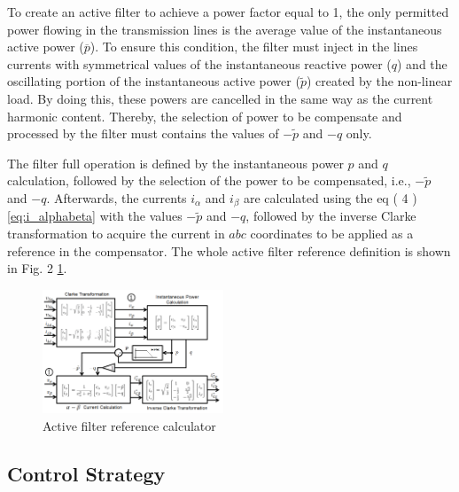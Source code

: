 To create an active filter to achieve a power factor equal to 1, the only permitted power flowing in the transmission lines is the average value of the instantaneous active power ($\overline{p}$). To ensure this condition, the filter must inject in the lines currents with symmetrical values of the instantaneous reactive power ($q$) and the oscillating portion of the instantaneous active power ($\tilde{p}$) created by the non-linear load. By doing this, these powers are cancelled in the same way as the current harmonic content. Thereby, the selection of power to be compensate and processed by the filter must contains the values of $-\tilde{p}$ and $-q$ only.

The filter full operation is defined by the instantaneous power $p$ and $q$ calculation, followed by the selection of the power to be compensated, i.e., $-\tilde{p}$ and $-q$. Afterwards, the currents $i_{\alpha}$ and $i_{\beta}$ are calculated using the eq ( 4 ) \ref{eq:i_alphabeta} with the values $-\tilde{p}$ and $-q$, followed by the inverse Clarke transformation to acquire the current in $abc$ coordinates to be applied as a reference in the compensator. The whole active filter reference definition is shown in Fig. 2 \ref{fig:diagrama_filtro.png}.

\begin{figure}[!th]
	\centering
	\includegraphics[width=0.48\textwidth]{Figures/diagrama_filtro.png}
	\caption{Active filter reference calculator}
	\label{fig:diagrama_filtro.png}
\end{figure}


\subsection{Control Strategy}


